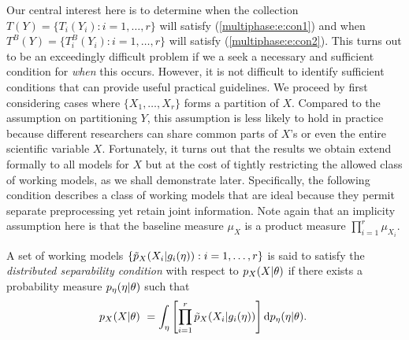 Our central interest here is to determine when the collection $T(Y)=\{T_i(Y_i): i=1,\ldots, r\}$ will satisfy (\ref{multiphase:e:con1}) and when $T^{B}(Y)=\{T_i^B(Y_i): i=1,\ldots, r\}$ will satisfy (\ref{multiphase:e:con2}).  This turns out to be an exceedingly difficult problem if we a seek a necessary and sufficient condition for \textit{when} this occurs. However, it is not difficult to identify sufficient conditions that can provide useful practical guidelines. We proceed by first considering cases where $\{X_1, \ldots, X_r\}$ forms a partition of $X$. Compared to the assumption on partitioning $Y$, this assumption is less likely to hold in practice because different researchers can share common  parts of $X$'s or even  the entire  scientific variable $X$.
Fortunately, it turns out that the results we obtain extend formally to all models for $X$ but at the cost of tightly restricting the allowed class of working models, as we shall demonstrate later.
Specifically, the following condition describes a class of working models that are ideal because they permit separate preprocessing yet retain joint information.
 Note again that an implicity assumption here is that the baseline measure $\mu_X$ is a product measure $\prod_{i=1}^r\mu_{X_i}$.
\begin{definition}
A set of working models $\{\tilde{p}_X(X_i |g_{i}(\eta)): i=1,\ldots, r\}$ is said to satisfy the \emph{distributed separability condition} with respect to $p_X(X | \theta)$ if there exists a probability measure $p_\eta( \eta | \theta)$ such that
\begin{equation}
 \psci(X | \param)\ = \int_\eta\left[ \prod_{i=1}^r \pwork(X_i | g_i(\workparam)) \right]\dd p_\workparam(\workparam | \param).\  \label{multiphase:eq:dsc}
\end{equation}
\end{definition}



